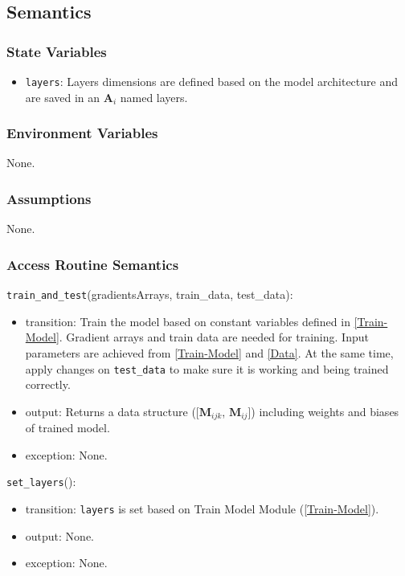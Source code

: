 \documentclass[12pt, titlepage]{article}
\def\code#1{\texttt{#1}}
\begin{document}
\subsection{Semantics}

\subsubsection{State Variables}
\begin{itemize}
  \item \code{layers}: Layers dimensions are defined based on the 
  model architecture and are saved in an $\mathbf{A}_{i}$ named layers.
\end{itemize}

\subsubsection{Environment Variables}
None.

\subsubsection{Assumptions}
None.

\subsubsection{Access Routine Semantics}

\noindent \code{train\_and\_test}(gradientsArrays, train\_data, test\_data):
\begin{itemize}
  \item transition: Train the model based on constant variables defined in \ref{Train-Model}. 
  Gradient arrays and train data are needed for training. Input parameters are achieved from 
  \ref{Train-Model} and \ref{Data}. At the same time, apply changes on \code{test\_data} to make 
  sure it is working and being trained correctly.
  \item output: Returns a data structure ([$\mathbf{M}_{ijk}$, $\mathbf{M}_{ij}$])
  including weights and biases of trained model.
  \item exception: None.
\end{itemize}

\noindent \code{set\_layers}():
\begin{itemize}
  \item transition: \code{layers} is set based on Train Model Module (\ref{Train-Model}).
  \item output: None.
  \item exception: None.
\end{itemize}
\end{document}
